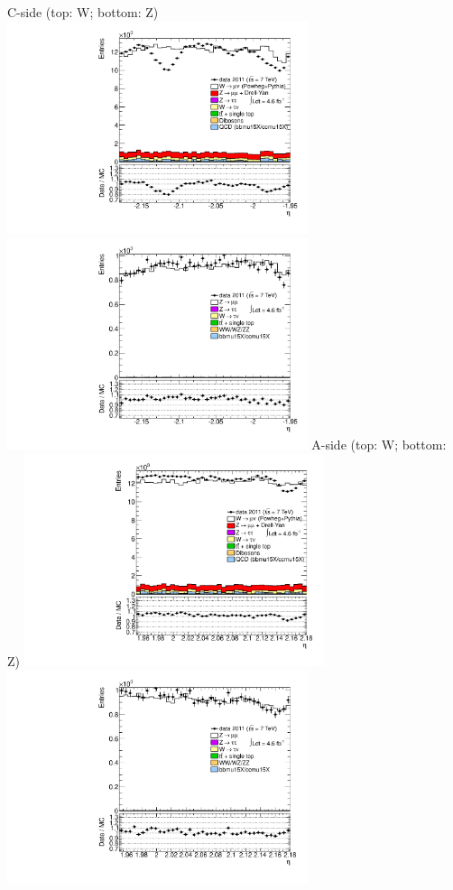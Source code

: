  {
\colb[T]
C-side (top: W; bottom: Z)
\centering
\includegraphics[width=0.66\textwidth]{dates/20130306/figures/both/W_10_C_stack_l_eta_POS} \\
\includegraphics[width=0.66\textwidth]{dates/20130306/figures/both/Z_10_C_stack_lP_eta_ALL.pdf}
A-side (top: W; bottom: Z)
\centering
\includegraphics[width=0.66\textwidth]{dates/20130306/figures/both/W_10_A_stack_l_eta_POS} \\
\includegraphics[width=0.66\textwidth]{dates/20130306/figures/both/Z_10_A_stack_lP_eta_ALL.pdf} 
\cole
}
